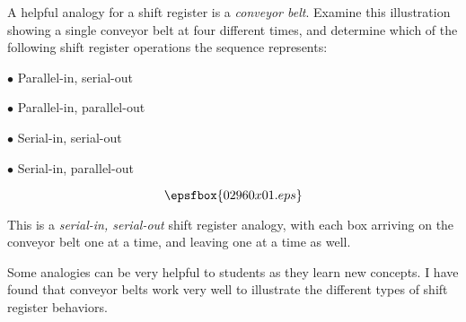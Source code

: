 

A helpful analogy for a shift register is a {\it conveyor belt}.  Examine this illustration showing a single conveyor belt at four different times, and determine which of the following shift register operations the sequence represents:

\medskip
\item{$\bullet$} Parallel-in, serial-out
\item{$\bullet$} Parallel-in, parallel-out
\item{$\bullet$} Serial-in, serial-out
\item{$\bullet$} Serial-in, parallel-out
\medskip

$$\epsfbox{02960x01.eps}$$







This is a {\it serial-in, serial-out} shift register analogy, with each box arriving on the conveyor belt one at a time, and leaving one at a time as well.







Some analogies can be very helpful to students as they learn new concepts.  I have found that conveyor belts work very well to illustrate the different types of shift register behaviors.




